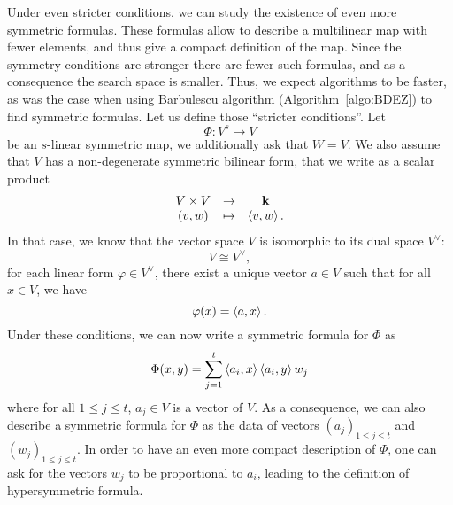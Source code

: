 Under even stricter conditions, we can study the existence of even more
symmetric formulas. These formulas allow to describe a multilinear map with
fewer elements, and thus give a compact definition of the map. Since the
symmetry conditions are stronger there are fewer such formulas, and as a
consequence the search space is smaller. Thus, we expect algorithms to be
faster, as was the case when using Barbulescu \etal algorithm
(Algorithm~\ref{algo:BDEZ}) to find symmetric formulas. Let us define those
``stricter conditions''. Let
\[
  \Phi:V^s\to V
\]
be an $s$-linear symmetric map, \ie we additionally ask that $W=V$. We also
assume that $V$ has a non-degenerate symmetric bilinear form, that we write as a
scalar product
\[
 \begin{array}{ccc}
 V\times V &\to&\mathbf{k}\\
 (v,w)&\mapsto&\left\langle v,w\right\rangle.
 \end{array}
\]
In that case, we know that the vector space $V$ is isomorphic to its dual space
$V^\vee$:
\[
  V\cong V^\vee,
\]
\ie for each linear form $\varphi\in V^\vee$, there exist a unique vector $a\in
V$ such that for all $x\in V$, we have
\[
  \varphi(x) = \left\langle a,x\right\rangle.
\]
Under these conditions, we can now write a symmetric formula for $\Phi$ as
\[
  \Phi(x, y) = \sum_{j=1}^t\left\langle a_i,x\right\rangle\left\langle a_i,y\right\rangle w_j
\]
where for all $1\leq j\leq t$, $a_j\in V$ is a vector of $V$. As a consequence,
we can also describe a symmetric formula for $\Phi$ as the data of vectors
$(a_j)_{1\leq j\leq t}$ and $(w_j)_{1\leq j\leq t}$. In order to have an even
more compact description of $\Phi$, one can ask for the vectors $w_j$ to be
proportional to $a_i$, leading to the definition of hypersymmetric
formula.
%
%
%
%
%

